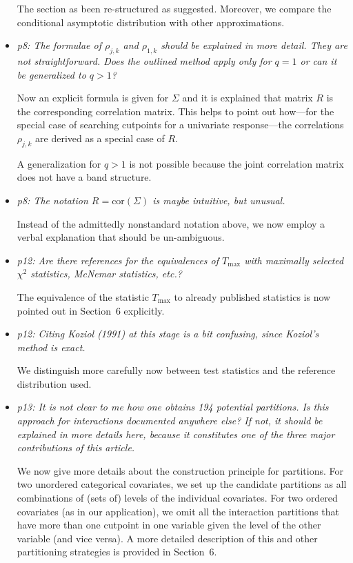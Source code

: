 \documentclass[11pt,a4paper]{article}
\begin{document}
\begin{itemize}
	The section as been re-structured as suggested. Moreover, 
        we compare the conditional asymptotic distribution with
        other approximations.
	
  \item \textit{p8: The formulae of $\rho_{j,k}$ and $\rho_{1,k}$ should be
        explained in more detail. They are not straightforward. Does the outlined
	method apply only for $q = 1$ or can it be generalized to $q > 1$?}
	
	Now an explicit formula is given for $\Sigma$ and it is explained that
	matrix $R$ is the corresponding correlation matrix. This
	helps to point out how---for the special case of searching cutpoints
	for a univariate response---the correlations $\rho_{j, k}$ are
	derived as a special case of $R$.
	
	A generalization for $q > 1$ is not possible because the joint correlation
	matrix does not have a band structure.
	
  \item \textit{p8: The notation $R = \mbox{cor}(\Sigma)$ is maybe intuitive, but unusual.}
  
        Instead of the admittedly nonstandard notation above, we now employ
	a verbal explanation that should be un-ambiguous.
	
  \item \textit{p12: Are there references for the equivalences of $T_{\max}$ with maximally
        selected $\chi^2$ statistics, McNemar statistics, etc.?}
	
	The equivalence of the statistic $T_\text{max}$ to already published
        statistics is now pointed out in Section~6 explicitly.
	
  \item \textit{p12: Citing Koziol (1991) at this stage is a bit confusing, since
        Koziol's method is exact.}
	
	We distinguish more carefully now between test statistics and the reference
	distribution used.
	
  \item \textit{p13: It is not clear to me how one obtains 194 potential partitions.
        Is this approach for interactions documented anywhere else? If not, it should be
        explained in more details here, because it constitutes one of the three major
        contributions of this article.}
	
	We now give more details about the construction principle for partitions.
        For two unordered categorical covariates, we set up the candidate partitions
	as all combinations of (sets of) levels of the individual covariates.	
	For two ordered covariates (as in our application), we omit all the interaction
	partitions that have more than one cutpoint in one variable given the
	level of the other variable (and vice versa). A more detailed description of
	this and other partitioning strategies is provided in Section~6.
	

\end{itemize}
\end{document}
